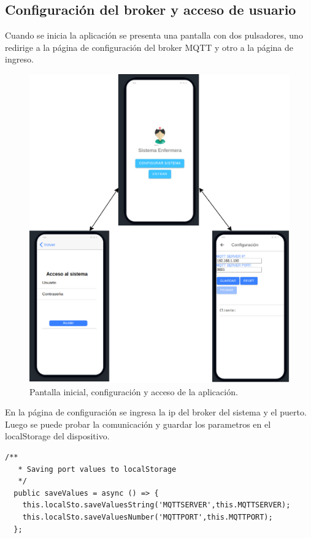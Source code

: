 \pagebreak

\subsection{Configuración del broker y acceso de usuario}

Cuando se inicia la aplicación se presenta una pantalla con dos pulsadores, uno redirige a la página de configuración del broker MQTT y otro a la página de ingreso.
\begin{figure}[ht]
	\centering
	\includegraphics[scale=.80]{./Figures/app/inicioApp.png}
	\caption{ Pantalla inicial, configuración y acceso de la aplicación.}
	\label{fig: Pantalla inicial, configuración y acceso de la aplicación.}
\end{figure} 

En la página de configuración se ingresa la ip del broker del sistema y el puerto. Luego se puede probar la comunicación y guardar los parametros en el localStorage del dispositivo.


\begin{lstlisting}[caption=  Funciones del servicio que guardan en el localStorage]
  /**
   * Saving port values to localStorage
   */
  public saveValues = async () => {     
    this.localSto.saveValuesString('MQTTSERVER',this.MQTTSERVER);
    this.localSto.saveValuesNumber('MQTTPORT',this.MQTTPORT);
  };
\end{lstlisting}

